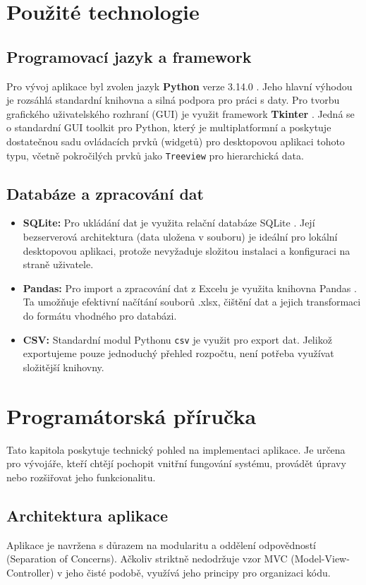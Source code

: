 \documentclass[
program=itk,
biblatex,
language=czech,
font=sans,
figures=true,
tables=false,
sourcecodes=false,
glossaries,
index
]{kidiplom}
\begin{document}
\section{Použité technologie}

\subsection{Programovací jazyk a framework}
Pro vývoj aplikace byl zvolen jazyk \textbf{Python} verze 3.14.0 \cite{python}. Jeho hlavní výhodou je rozsáhlá standardní knihovna a silná podpora pro práci s daty.
Pro tvorbu grafického uživatelského rozhraní (GUI) je využit framework \textbf{Tkinter} \cite{tkinter}. Jedná se o standardní GUI toolkit pro Python, který je multiplatformní a poskytuje dostatečnou sadu ovládacích prvků (widgetů) pro desktopovou aplikaci tohoto typu, včetně pokročilých prvků jako \texttt{Treeview} pro hierarchická data.

\subsection{Databáze a zpracování dat}
\begin{itemize}
    \item \textbf{SQLite:} Pro ukládání dat je využita relační databáze SQLite \cite{sqlite}. Její bezserverová architektura (data uložena v souboru) je ideální pro lokální desktopovou aplikaci, protože nevyžaduje složitou instalaci a konfiguraci na straně uživatele.
    \item \textbf{Pandas:} Pro import a zpracování dat z Excelu je využita knihovna Pandas \cite{pandas}. Ta umožňuje efektivní načítání souborů .xlsx, čištění dat a jejich transformaci do formátu vhodného pro databázi.
    \item \textbf{CSV:} Standardní modul Pythonu \texttt{csv} je využit pro export dat. Jelikož exportujeme pouze jednoduchý přehled rozpočtu, není potřeba využívat složitější knihovny.
\end{itemize}

\section{Programátorská příručka}
Tato kapitola poskytuje technický pohled na implementaci aplikace. Je určena pro vývojáře, kteří chtějí pochopit vnitřní fungování systému, provádět úpravy nebo rozšiřovat jeho funkcionalitu.

\subsection{Architektura aplikace}
Aplikace je navržena s důrazem na modularitu a oddělení odpovědností (Separation of Concerns). Ačkoliv striktně nedodržuje vzor MVC (Model-View-Controller) \cite{mvc} v jeho čisté podobě, využívá jeho principy pro organizaci kódu.
\end{document}

